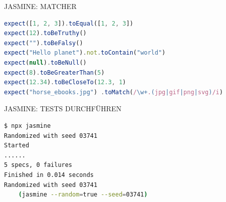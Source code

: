 \begin{code}{JASMINE: MATCHER}
\begin{lstlisting}[language=JavaScript, style=basesmol]
expect([1, 2, 3]).toEqual([1, 2, 3])
expect(12).toBeTruthy()
expect("").toBeFalsy()
expect("Hello planet").not.toContain("world")
expect(null).toBeNull()
expect(8).toBeGreaterThan(5)
expect(12.34).toBeCloseTo(12.3, 1)
expect("horse_ebooks.jpg") .toMatch(/\w+.(jpg|gif|png|svg)/i)
\end{lstlisting}
\end{code}

\begin{KR}{JASMINE: TESTS DURCHFÜHREN}
\begin{lstlisting}[language=bash, style=basesmol]
$ npx jasmine
Randomized with seed 03741
Started
......
5 specs, 0 failures
Finished in 0.014 seconds
Randomized with seed 03741 
    (jasmine --random=true --seed=03741)
\end{lstlisting}
\end{KR}